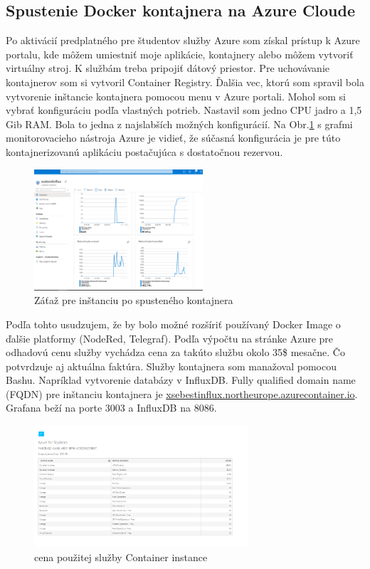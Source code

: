 \documentclass[../main.tex]{subfiles}
\begin{document}
\subsection{Spustenie Docker kontajnera na Azure Cloude}
Po aktivácií predplatného pre študentov služby Azure som získal prístup k Azure portalu, kde môžem umiestniť moje aplikácie, kontajnery alebo môžem vytvoriť virtuálny stroj. K službám treba pripojiť dátový priestor. Pre uchovávanie kontajnerov som si vytvoril Container Registry. Ďalšia vec, ktorú som spravil bola vytvorenie inštancie kontajnera pomocou menu v Azure portali. Mohol som si vybrať konfiguráciu podľa vlastných potrieb. Nastavil som jedno CPU jadro a 1,5 Gib RAM. Bola to jedna z najslabších možných konfigurácií. Na Obr.\ref{fig:azure_monitor} s grafmi monitorovacieho nástroja Azure je vidieť, že súčasná konfigurácia je pre túto kontajnerizovanú aplikáciu postačujúca s dostatočnou rezervou.
\begin{figure}
    \centering
    \includegraphics[width = 0.56\textwidth]{images/azure_monitor.png}
    \caption{Záťaž pre inštanciu po spusteného kontajnera}
    \label{fig:azure_monitor}
\end{figure}
Podľa tohto usudzujem, že by bolo možné rozšíriť používaný Docker Image o ďalšie platformy (NodeRed, Telegraf). Podľa výpočtu na stránke Azure %
pre odhadovú cenu služby vychádza cena za takúto službu okolo 35\$ mesačne. Čo potvrdzuje aj aktuálna faktúra. Služby kontajnera som manažoval pomocou Bashu. Napríklad vytvorenie databázy v InfluxDB. Fully qualified domain name (FQDN) pre inštanciu kontajnera je
\newline\url{xsebestinflux.northeurope.azurecontainer.io}. Grafana beží na porte 3003 a InfluxDB na 8086.

\begin{figure}[h!]
    \centering
    \includegraphics[width = 0.71\textwidth]{images/subscription_cost_azure.png}
    \caption{cena použitej služby Container instance}
    \label{fig:cost}
\end{figure}
\end{document}

